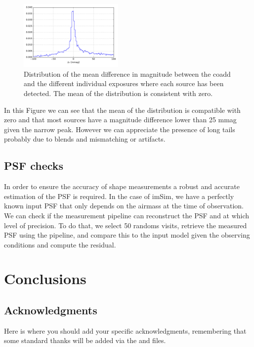 \documentclass[\docopts]{\docclass}
\begin{document}
\begin{figure}
  \centering
  \includegraphics[width=0.45\textwidth]{photometry_internal_10visits_imsim_undithered}
  \caption{Distribution of the mean difference in magnitude between the coadd and the different individual exposures
  where each source has been detected. The mean of the distribution is consistent with zero.}
  \label{fig:internal_photometry_a}
\end{figure}

In this Figure we can see that the mean of the distribution is compatible with zero and that most sources have a magnitude difference lower
than 25 mmag given the narrow peak. However we can appreciate the presence of long tails probably due to blends and mismatching or artifacts.

\subsection{PSF checks}
\label{sec:psf_checks}

In order to ensure the accuracy of shape measurements a robust and accurate estimation of the PSF is required. In the case of imSim, we have
a perfectly known input PSF that only depends on the airmass at the time of observation. We can check if the measurement pipeline can reconstruct
the PSF and at which level of precision. To do that, we select 50 randoms visits, retrieve the measured PSF using the pipeline, and compare this
to the input model given the observing conditions and compute the residual.

\section{Conclusions}
\label{sec:conclusions}



\subsection*{Acknowledgments}

Here is where you should add your specific acknowledgments, remembering that some standard thanks will be added
via the  and  files.







\end{document}
